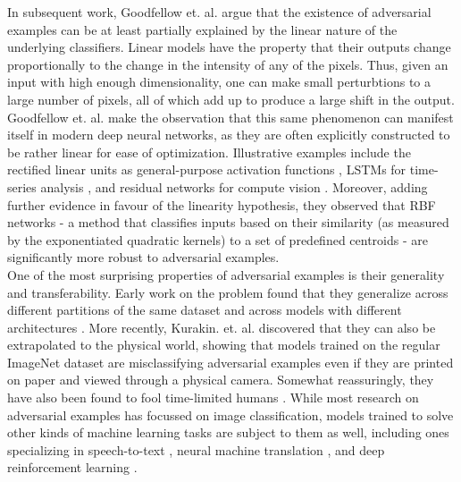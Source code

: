 \documentclass{report}
\begin{document}
\noindent In subsequent work, Goodfellow et. al. \cite{explaining-and-harnessing} argue that the existence of adversarial examples can be at least partially explained by the linear nature of the underlying classifiers. Linear models have the property that their outputs change proportionally to the change in the intensity of any of the pixels. Thus, given an input with high enough dimensionality, one can make small perturbtions to a large number of pixels, all of which add up to produce a large shift in the output. Goodfellow et. al. make the observation that this same phenomenon can manifest itself in modern deep neural networks, as they are often explicitly constructed to be rather linear for ease of optimization. Illustrative examples include the rectified linear units as general-purpose activation functions \cite{relu}, LSTMs for time-series analysis \cite{lstm}, and residual networks for compute vision \cite{resnet}. Moreover, adding further evidence in favour of the linearity hypothesis, they observed that RBF networks \cite{rbf-networks} - a method that classifies inputs based on their similarity (as measured by the exponentiated quadratic kernels) to a set of predefined centroids - are significantly more robust to adversarial examples. \\

\noindent One of the most surprising properties of adversarial examples is their generality and transferability. Early work on the problem found that they generalize across different partitions of the same dataset \cite{intriguing-properties} and across models with different architectures \cite{explaining-and-harnessing}. More recently, Kurakin. et. al. \cite{kurakin16} discovered that they can also be extrapolated to the physical world, showing that models trained on the regular ImageNet \cite{imagenet} dataset are misclassifying adversarial examples even if they are printed on paper and viewed through a physical camera. Somewhat reassuringly, they have also been found to fool time-limited humans \cite{humans-adv}. While most research on adversarial examples has focussed on image classification, models trained to solve other kinds of machine learning tasks are subject to them as well, including ones specializing in speech-to-text \cite{audio-adv}, neural machine translation \cite{nmt-adv}, and deep reinforcement learning \cite{rl-adv}. \\
\end{document}
